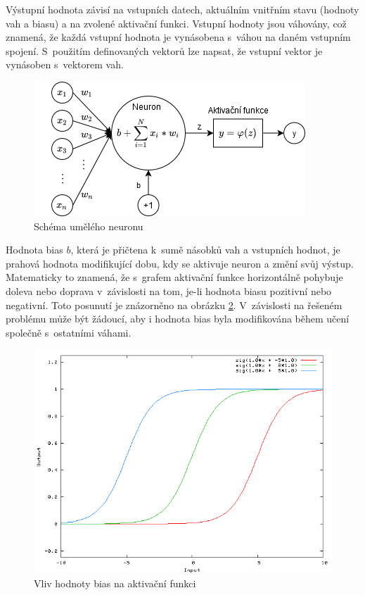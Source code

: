 Výstupní hodnota závisí na vstupních datech, aktuálním vnitřním stavu (hodnoty vah a biasu) a na zvolené aktivační funkci. Vstupní hodnoty jsou váhovány, což znamená, že každá vstupní hodnota je vynásobena s~váhou na daném vstupním spojení. S~použitím definovaných vektorů lze napsat, že vstupní vektor je vynásoben s~vektorem vah.

\begin{figure}[H]
    \centering
    \includegraphics[scale=0.85]{obrazky-figures/perceptron.png}
    \caption{\label{fig:neuron}Schéma umělého neuronu}
\end{figure}

Hodnota bias $b$, která je přičtena k~sumě násobků vah a vstupních hodnot, je prahová hodnota modifikující dobu, kdy se aktivuje neuron a změní svůj výstup. Matematicky to znamená, že s~grafem aktivační funkce horizontálně pohybuje doleva nebo doprava v~závislosti na tom, je-li hodnota biasu pozitivní nebo negativní. Toto posunutí je znázorněno na obrázku \ref{fig:bias}. V~závislosti na řešeném problému může být žádoucí, aby i hodnota bias byla modifikována během učení společně s~ostatními váhami.

\begin{figure}[H]
    \centering
    \includegraphics[scale=0.4]{obrazky-figures/bias.png}
    \caption{\label{fig:bias}Vliv hodnoty bias na aktivační funkci}
\end{figure}


